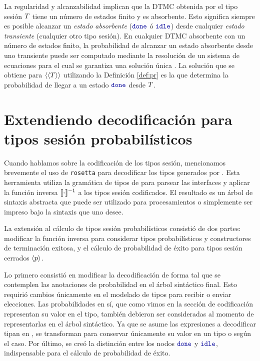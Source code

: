 La regularidad y alcanzabilidad implican que la DTMC obtenida por el tipo
sesión $T$ tiene un número de estados finito y es absorbente. Esto
significa siempre es posible alcanzar un \emph{estado absorbente} ($\Done$ ó
$\Idle$) desde cualquier \emph{estado transiente} (cualquier otro tipo sesión).
En cualquier DTMC absorbente con un número de estados finito, la probabilidad
de alcanzar un estado absorbente desde uno transiente puede ser computado
mediante la resolución de un sistema de ecuaciones para el cual se garantiza
una solución única . La solución que se obtiene para
$\langle\langle T\rangle\rangle$ utilizando la Definición \ref{def:pr} es la que determina
la probabilidad de llegar a un estado $\Done$ desde $T$.

\section{Extendiendo decodificación para tipos sesión probabilísticos}

Cuando hablamos sobre la codificación de los tipos sesión, mencionamos
brevemente el uso de \texttt{rosetta} para decodificar los tipos generados por
\OCaml. Esta herramienta utiliza la gramática de tipos de \OCaml para parsear
las interfaces y aplicar la función inversa $\llbracket\cdot\rrbracket^{-1}$ a los tipos sesión
codificados. El resultado es un árbol de sintaxis abstracta que puede ser
utilizado para procesamientos o simplemente ser impreso bajo la sintaxis que
uno desee.

La extensión al cálculo de tipos sesión probabilísticos consistió de dos
partes: modificar la función inversa para considerar tipos probabilísticos y
constructores de terminación exitosa, y el cálculo de probabilidad de éxito
para tipos sesión cerrados $\langle p \rangle$.

Lo primero consistió en modificar la decodificación de forma tal que se
contemplen las anotaciones de probabilidad en el árbol sintáctico final. Esto
requirió cambios únicamente en el modelado de tipos para recibir o enviar
elecciones. Las probabilidades en sí, que como vimos en la sección de
codificación representan su valor en el tipo, también debieron ser consideradas
al momento de representarlas en el árbol sintáctico. Ya que se asume las
expresiones a decodificar tipan en \OCaml, se transforman para conservar
únicamente su valor en un tipo  o  según el caso. Por último,
se creó la distinción entre los nodos $\Done$ y $\Idle$, indispensable para el
cálculo de probabilidad de éxito.

